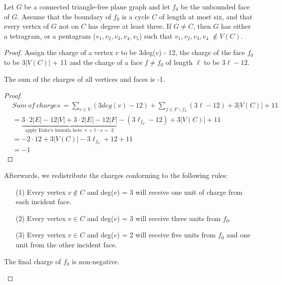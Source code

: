 \begin{lemma}
Let $G$ be a connected triangle-free plane graph and let $f_0$ be the
unbounded face of $G$. Assume that the boundary of $f_0$ is a cycle $C$ of length
at most six, and that every vertex of $G$ not on $C$ has degree at least three. If
$G \ne C$, then $G$ has either a tetragram, or a pentagram ($v_1, v_2, v_3, v_4, v_5$) such
that $v_1, v_2, v_3, v_4$ $\notin V(C)$. \cite{dvorak2013threecoloring}
\end{lemma}

\begin{proof}
Assign the charge of a vertex $v$ to be 3deg($v$) - 12, the charge of the face $f_0$ to be $3|V(C)|$ + 11 and the charge of a face $f \ne f_0$ of length $\ell$ to be $3 \ell - 12$. 
    \begin{claim}
    The sum of the charges of all vertices and faces is -1.
    \end{claim}
    \begin{proof}
        \begin{align*}
            & Sum \ of \ charges \ = \sum_{v \in V}(3deg(v) - 12) + \sum_{f \in F \backslash {f_0}} (3\ell - 12) + 3|V(C)| + 11 \\
            &= \underbrace{3 \cdot 2|E| - 12 |V| + 3\cdot2|E| - 12|F|}_{\text{apply Euler's formula here: v + f - e = -2}} - (3\ell_{f_0} - 12) + 3|V(C)| + 11 \\
            &=-2 \cdot 12 + 3|V(C)|- 3\ell_{f_0} + 12 + 11\\
            &= -1
        \end{align*}
    \end{proof}
    Afterwards, we redistribute the charges conforming to the following rules:
    \begin{itemize}
        \item[(1)] Every vertex $v \notin C$ and deg($v$) = 3 will receive one unit of charge from each incident face.
        \item[(2)] Every vertex $v \in C$ and deg($v$) = 3 will receive three units from $f_0$.
        \item[(3)] Every vertex $v \in C$ and deg($v$) = 2 will receive five units from $f_0$ and one unit from the other incident face. 
    \end{itemize}
    
    \begin{claim}
    The final charge of $f_0$ is non-negative.
    \end{claim}
    

\end{proof}
